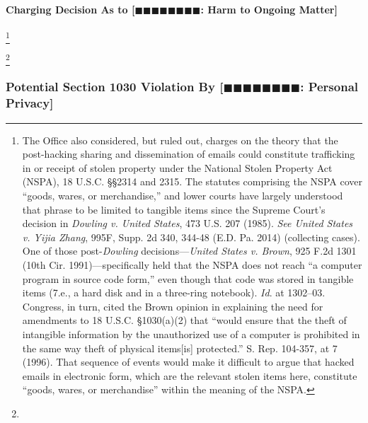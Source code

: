 \paragraph{Charging Decision As to [$\blacksquare\blacksquare\blacksquare\blacksquare\blacksquare\blacksquare\blacksquare\blacksquare$: Harm to Ongoing Matter]}
\footnote{The Office also considered, but ruled out, charges on the theory that the post-hacking sharing and dissemination of emails could constitute trafficking in or receipt of stolen property under the National Stolen Property Act (NSPA), 18 U.S.C. \S\S 2314 and 2315.
The statutes comprising the NSPA cover “goods, wares, or merchandise,” and lower courts have largely understood that phrase to be limited to tangible items since the Supreme Court's decision in \textit{Dowling v. United States}, 473 U.S. 207 (1985).
\textit{See United States v. Yijia Zhang}, 995F, Supp. 2d 340, 344-48 (E.D. Pa. 2014) (collecting cases).
One of those post-\textit{Dowling} decisions---\textit{United States v. Brown}, 925 F.2d 1301 (10th Cir. 1991)---specifically held that the NSPA does not reach “a computer program in source code form,” even though that code was stored in tangible items (7.e., a hard disk and in a three-ring notebook).
\textit{Id}. at 1302--03.
Congress, in turn, cited the Brown opinion in explaining the need for amendments to 18 U.S.C. \S 1030(a)(2) that “would ensure that the theft of intangible information by the unauthorized use of a computer is prohibited in the same way theft of physical items[is] protected.”
S. Rep. 104-357, at 7 (1996).
That sequence of events would make it difficult to argue that hacked emails in electronic form, which are the relevant stolen items here, constitute “goods, wares, or merchandise” within the meaning of the NSPA.}




\footnote{}






\subsubsection{Potential Section 1030 Violation By [$\blacksquare\blacksquare\blacksquare\blacksquare\blacksquare\blacksquare\blacksquare\blacksquare$: Personal Privacy]}

